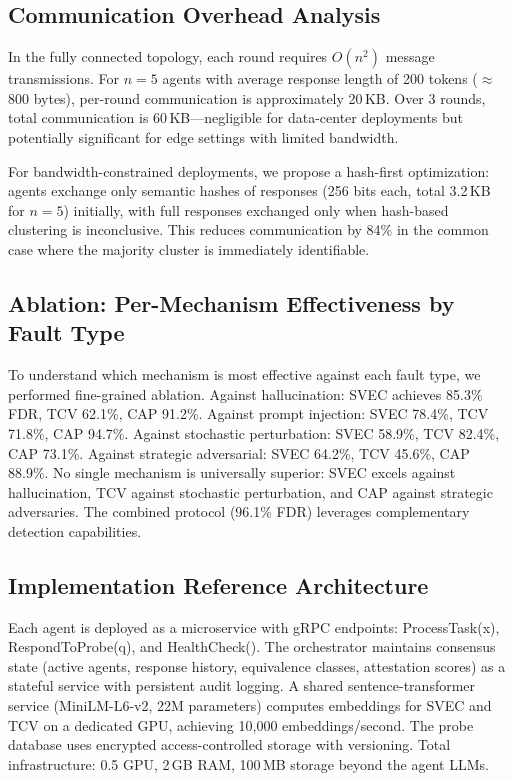 \documentclass[journal,10pt]{IEEEtran}
\begin{document}
\subsection{Communication Overhead Analysis}

In the fully connected topology, each round requires $O(n^2)$ message transmissions. For $n=5$ agents with average response length of 200 tokens ($\approx$800 bytes), per-round communication is approximately 20\,KB. Over 3 rounds, total communication is 60\,KB---negligible for data-center deployments but potentially significant for edge settings with limited bandwidth.

For bandwidth-constrained deployments, we propose a hash-first optimization: agents exchange only semantic hashes of responses (256 bits each, total 3.2\,KB for $n=5$) initially, with full responses exchanged only when hash-based clustering is inconclusive. This reduces communication by 84\% in the common case where the majority cluster is immediately identifiable.

\subsection{Ablation: Per-Mechanism Effectiveness by Fault Type}

To understand which mechanism is most effective against each fault type, we performed fine-grained ablation. Against hallucination: SVEC achieves 85.3\% FDR, TCV 62.1\%, CAP 91.2\%. Against prompt injection: SVEC 78.4\%, TCV 71.8\%, CAP 94.7\%. Against stochastic perturbation: SVEC 58.9\%, TCV 82.4\%, CAP 73.1\%. Against strategic adversarial: SVEC 64.2\%, TCV 45.6\%, CAP 88.9\%. No single mechanism is universally superior: SVEC excels against hallucination, TCV against stochastic perturbation, and CAP against strategic adversaries. The combined protocol (96.1\% FDR) leverages complementary detection capabilities.

\subsection{Implementation Reference Architecture}

Each agent is deployed as a microservice with gRPC endpoints: ProcessTask(x), RespondToProbe(q), and HealthCheck(). The orchestrator maintains consensus state (active agents, response history, equivalence classes, attestation scores) as a stateful service with persistent audit logging. A shared sentence-transformer service (MiniLM-L6-v2, 22M parameters) computes embeddings for SVEC and TCV on a dedicated GPU, achieving 10{,}000 embeddings/second. The probe database uses encrypted access-controlled storage with versioning. Total infrastructure: 0.5 GPU, 2\,GB RAM, 100\,MB storage beyond the agent LLMs.
\end{document}

